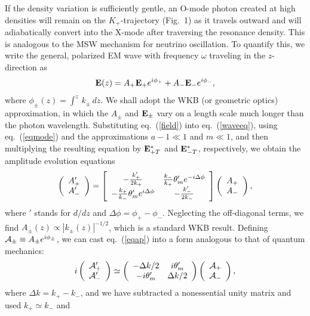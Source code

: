 \documentclass{aastex}
\def\be{\begin{equation}}
\def\ee{\end{equation}}
\def\bE{{\bf E}}
\def\cA{{\cal A}}
\begin{document}
If the density variation is sufficiently gentle,
an O-mode photon created at high densities will remain
on the $K_+$-trajectory (Fig.~1) as it travels outward
and will adiabatically convert into the X-mode after traversing
the resonance density. This is analogous to the MSW mechanism
for neutrino oscillation. To quantify this, we write the general, 
polarized EM wave with frequency $\omega$ traveling 
in the $z$-direction as
\be
\bE(z)=A_+\bE_+e^{i\phi_+}+A_-\bE_- e^{i\phi_-},
\label{field}\ee
where $\phi_\pm(z)=\int^z\,k_\pm\,dz$.
We shall adopt the WKB (or geometric optics) approximation,
in which the $A_\pm$ and $\bE_\pm$ vary on a length scale
much longer than the photon wavelength. Substituting eq.~(\ref{field})
into eq.~(\ref{waveeq}), using eq.~(\ref{eqmode})
and the approximations $a-1\ll1$ and $m\ll 1$, and then multiplying
the resulting equation by $\bE_{+T}^\ast$ and $\bE_{-T}^\ast$, respectively,
we obtain the amplitude evolution equations
\be
\left(\begin{array}{c}A_+'\\A_-'\end{array}\right)
=\left[\begin{array}{cc}
-{k_+'\over 2k_+} & {k_-\over k_+}\theta_m' e^{-i\Delta\phi} \\
-{k_+\over k_-}\theta_m' e^{i\Delta\phi} & -{k_-'\over 2k_-}
\end{array} \right]
\left(\begin{array}{c}A_+\\A_-\end{array}\right),
\label{eqap}\ee
where $'$ stands for $d/dz$ and $\Delta\phi=\phi_+-\phi_-$.
Neglecting the off-diagonal terms, we find
$A_\pm(z)\propto |k_\pm(z)|^{-1/2}$, which is a standard WKB result.
Defining $\cA_\pm\equiv A_\pm e^{i\phi_\pm}$,
we can cast eq.~(\ref{eqap}) into a form analogous to that of
quantum mechanics:
\be
i\left(\begin{array}{c}\cA_+'\\ \cA_-'\end{array}\right)
\simeq \left(\begin{array}{cc}
-\Delta k/2 & i\theta_m'\\
-i\theta_m' & \Delta k/2
\end{array} \right)
\left(\begin{array}{c}\cA_+\\ \cA_-\end{array}\right),
\label{eqap2}\ee
where $\Delta k=k_+-k_-$, and we have subtracted a nonessential
unity matrix and used $k_+\simeq k_-$ and
\end{document}
